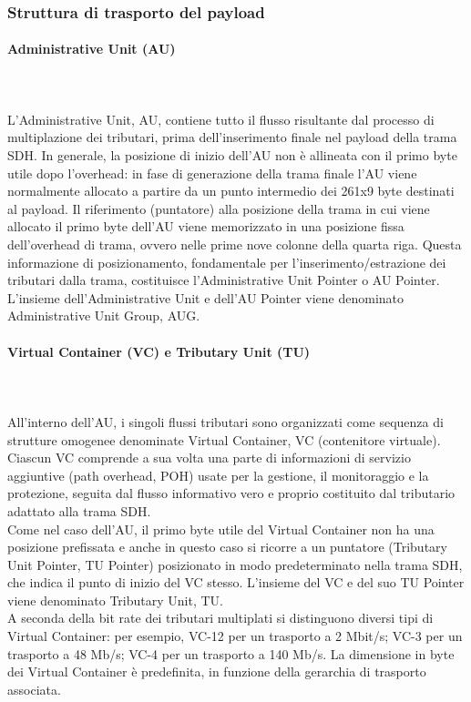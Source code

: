 \documentclass[8pt]{extarticle}
\begin{document}
\subsubsection{Struttura di trasporto del payload}
\paragraph{Administrative Unit (AU)}
\noindent
\\\\
L'Administrative Unit, AU, contiene tutto il flusso risultante dal processo di multiplazione dei tributari,
 prima dell'inserimento finale nel payload della trama SDH.
In generale, la posizione di inizio dell'AU non è allineata con il primo byte utile dopo l'overhead: 
in fase di generazione della trama finale l'AU viene normalmente allocato a partire da un punto intermedio 
dei 261x9 byte destinati al payload. Il riferimento (puntatore) alla posizione della trama in cui viene 
allocato il primo byte dell'AU viene memorizzato in una posizione fissa dell'overhead di trama, ovvero 
nelle prime nove colonne della quarta riga. Questa informazione di posizionamento, fondamentale per 
l'inserimento/estrazione dei tributari dalla trama, costituisce l'Administrative Unit Pointer o AU Pointer. 
L'insieme dell'Administrative Unit e dell'AU Pointer viene denominato Administrative Unit Group, AUG.
\paragraph{Virtual Container (VC) e Tributary Unit (TU)}
\noindent
\\\\
All'interno dell'AU, i singoli flussi tributari sono organizzati come sequenza di strutture omogenee 
denominate Virtual Container, VC (contenitore virtuale). Ciascun VC comprende a sua volta una parte 
di informazioni di servizio aggiuntive (path overhead, POH) usate per la gestione, il monitoraggio e la 
protezione, seguita dal flusso informativo vero e proprio costituito dal tributario adattato alla trama SDH.\\
Come nel caso dell'AU, il primo byte utile del Virtual Container non ha una posizione prefissata e anche 
in questo caso si ricorre a un puntatore (Tributary Unit Pointer, TU Pointer) posizionato in modo 
predeterminato nella trama SDH, che indica il punto di inizio del VC stesso. L'insieme del VC e del suo 
TU Pointer viene denominato Tributary Unit, TU.\\
A seconda della bit rate dei tributari multiplati si distinguono diversi tipi di Virtual Container: 
per esempio, VC-12 per un trasporto a 2 Mbit/s; VC-3 per un trasporto a 48 Mb/s; VC-4 per un trasporto 
a 140 Mb/s. La dimensione in byte dei Virtual Container è predefinita, in funzione della gerarchia di 
trasporto associata.
\end{document}
